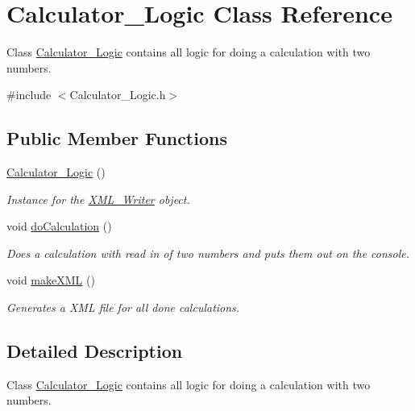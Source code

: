 \hypertarget{class_calculator___logic}{}\section{Calculator\+\_\+\+Logic Class Reference}
\label{class_calculator___logic}


Class \mbox{\hyperlink{class_calculator___logic}{Calculator\+\_\+\+Logic}} contains all logic for doing a calculation with two numbers.  




{\ttfamily \#include $<$Calculator\+\_\+\+Logic.\+h$>$}

\subsection*{Public Member Functions}
\begin{DoxyCompactItemize}
\item 
\mbox{\hyperlink{class_calculator___logic_a27b85b3ddd41cecb9df8eae25abac7d8}{Calculator\+\_\+\+Logic}} ()
\begin{DoxyCompactList}\small\item\em Instance for the \mbox{\hyperlink{class_x_m_l___writer}{X\+M\+L\+\_\+\+Writer}} object. \end{DoxyCompactList}\item 
void \mbox{\hyperlink{class_calculator___logic_abcda28576f17aaa75e3088b70668e3ab}{do\+Calculation}} ()
\begin{DoxyCompactList}\small\item\em Does a calculation with read in of two numbers and puts them out on the console. \end{DoxyCompactList}\item 
void \mbox{\hyperlink{class_calculator___logic_acbfb4467582baf8386d841b8ea1e7f7b}{make\+X\+ML}} ()
\begin{DoxyCompactList}\small\item\em Generates a X\+ML file for all done calculations. \end{DoxyCompactList}\end{DoxyCompactItemize}


\subsection{Detailed Description}
Class \mbox{\hyperlink{class_calculator___logic}{Calculator\+\_\+\+Logic}} contains all logic for doing a calculation with two numbers. 

